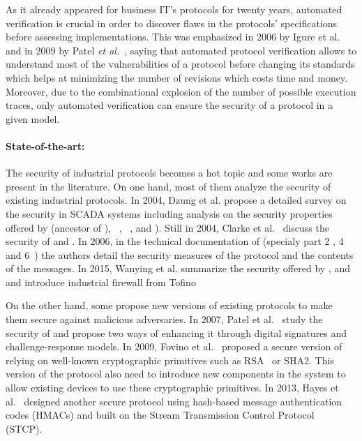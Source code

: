 As it already appeared for business IT's protocols for twenty years, automated
verification is crucial in order to discover flaws in the protocols'
specifications before assessing implementations.  This was emphasized
in 2006 by Igure et al.~\cite{ILW06} and in 2009 by Patel \emph{et
al.}~\cite{PBG09}, saying that automated protocol verification allows
to understand most of the vulnerabilities of a protocol before
changing its standards which helps at minimizing the number of
revisions which costs time and money.  Moreover, due to the
combinational explosion of the number of possible execution traces,
only automated verification can ensure the security of a protocol in a
given model.




\paragraph{State-of-the-art:}\label{sec:intro_sota}

The security of industrial protocols becomes a hot topic and some works are
present in the literature.
On one hand, most of them analyze the security of existing industrial protocols.
In 2004, Dzung et al. propose a detailed survey on the security in SCADA systems
including analysis on the security properties offered by \opc (ancestor of
\opcua), \mms~\cite{ISO_MMS}, ~\cite{IEC_61850}, \iccp
\cite{IEC_60870} and \etherip).
Still in 2004, Clarke et al.~\cite{CR04} discuss the security of \dnp and
\iccp.
In 2006, in the technical documentation of \opcua (specialy part 2
\cite{opcua_part2}, 4~\cite{opcua_part4} and 6~\cite{opcua_part6}) the authors
detail the security measures of the protocol and the contents of the messages.
In 2015, Wanying et al. summarize the security offered by \modbus, \dnp and \opc
and introduce industrial firewall from Tofino~\cite{TOFINO}

On the other hand, some propose new versions of existing protocols to make them
secure against malicious adversaries.
In 2007, Patel et al.~\cite{PY07} study the security of \dnp and propose two
ways of enhancing it through digital signatures and challenge-response models.
In 2009, Fovino et al.~\cite{FCMT09} proposed a secure version of \modbus
relying on well-known cryptographic primitives such as RSA~\cite{RSA78} or SHA2.
This version of the protocol also need to introduce new components in the system
to allow existing devices to use these cryptographic primitives.
In 2013, Hayes et al.~\cite{HE13} designed another secure \modbus protocol using
hash-based message authentication codes (HMACs) and built on the Stream
Transmission Control Protocol~\cite{Ste07} (STCP).

